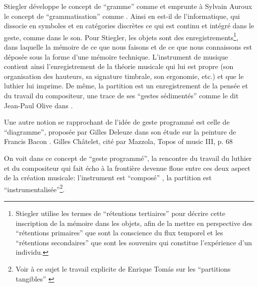 \indent Stiegler développe le concept de ``gramme'' comme  et emprunte à Sylvain Auroux \cite{auroux_revolution_1994} le concept de ``grammatisation'' comme . Ainsi en est-il de l'informatique, qui dissocie en symboles et en catégories discrètes ce qui est continu et intégré dans le geste, comme dans le son. Pour Stiegler, les objets sont des enregistrements\footnote{Stiegler utilise les termes de ``rétentions tertiaires'' pour décrire cette inscription de la mémoire dans les objets, afin de la mettre en perspective des ``rétentions primaires'' que sont la conscience du flux temporel et les ``rétentions secondaires'' que sont les souvenirs qui constitue l'expérience d'un individu.}, dans laquelle la mémoire de ce que nous faisons et de ce que nous connaissons est déposée sous la forme d'une mémoire technique. L'instrument de musique contient ainsi l'enregistrement de la théorie musicale qui lui est propre (son organisation des hauteurs, sa signature timbrale, son ergonomie, etc.) et que le luthier lui imprime. De même, la partition est un enregistrement de la pensée et du travail du compositeur, une trace de ses ``gestes sédimentés'' comme le dit Jean-Paul Olive dans \cite{olive_expression_2013}.

Une autre notion se rapprochant de l'idée de geste programmé est celle de ``diagramme'', proposée par Gilles Deleuze dans son étude sur la peinture de Francis Bacon \cite{deleuze_francis_1981}.
 Gilles Châtelet, cité par Mazzola, Topos of music III, p. 68


On voit dans ce concept de ``geste programmé'', la rencontre du travail du luthier et du compositeur qui fait écho à la frontière devenue floue entre ces deux aspect de la création musicale: l'instrument est ``composé'' \cite{schnell_introducing_2002}, la partition est ``instrumentalisée''\footnote{Voir à ce sujet le travail explicite de Enrique Tomás sur les ``partitions tangibles'' \cite{tomas_tangible_2014}}.

\cite{dobrian_e_2006}


